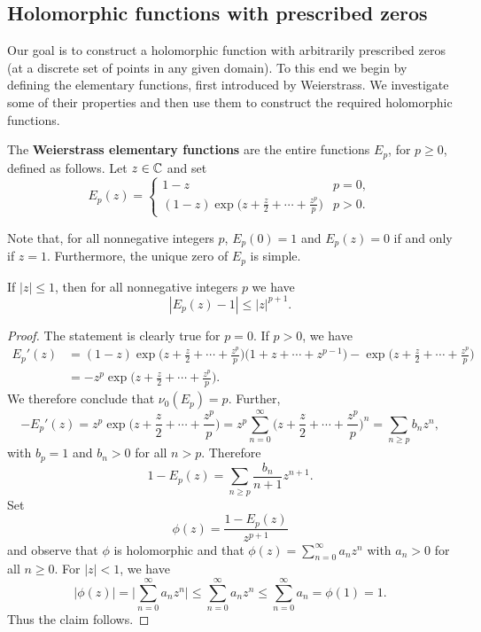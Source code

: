 \subsection{Holomorphic functions with prescribed zeros}
Our goal is to construct a holomorphic function with arbitrarily prescribed zeros (at a discrete set of points in any given domain). To this end we begin by defining the elementary functions, first introduced by Weierstrass. We investigate some of their properties and then use them to construct the required holomorphic functions.
\begin{definition}
The \textbf{Weierstrass elementary functions} are the entire functions $E_p$, for $p\geq 0$, defined as follows. Let $z\in\mathbb{C}$ and set
\[E_p(z)=\begin{cases}
1-z&p=0,\\
(1-z)\exp\Big(\displaystyle{z+\frac{z}{2}+\cdots+\frac{z^p}{p}}\Big)&p>0.
\end{cases}\]
\end{definition}
Note that, for all nonnegative integers $p$, $E_p(0)=1$ and $E_p(z)=0$ if and only if $z=1$. Furthermore, the unique zero of $E_p$ is simple.
\begin{lemma}\label{Weierstrass elementary function growth}
If $|z|\leq 1$, then for all nonnegative integers $p$ we have
\[|E_p(z)-1|\leq|z|^{p+1}.\]
\end{lemma}
\begin{proof}
The statement is clearly true for $p=0$. If $p>0$, we have
\begin{align*}
E_p'(z)&=(1-z)\exp\Big(z+\frac{z}{2}+\cdots+\frac{z^p}{p}\Big)\Big(1+z+\cdots+z^{p-1}\Big)-\exp\Big(z+\frac{z}{2}+\cdots+\frac{z^p}{p}\Big)\\
&=-z^p\exp\Big(z+\frac{z}{2}+\cdots+\frac{z^p}{p}\Big).
\end{align*}
We therefore conclude that $\nu_0(E_p)=p$. Further,
\[-E_p'(z)=z^p\exp\Big(z+\frac{z}{2}+\cdots+\frac{z^p}{p}\Big)=z^p\sum_{n=0}^{\infty}\Big(z+\frac{z}{2}+\cdots+\frac{z^p}{p}\Big)^n=\sum_{n\geq p}b_nz^n,\]
with $b_p=1$ and $b_n>0$ for all $n>p$. Therefore
\[1-E_p(z)=\sum_{n\geq p}\frac{b_n}{n+1}z^{n+1}.\]
Set
\[\phi(z)=\frac{1-E_p(z)}{z^{p+1}}\]
and observe that $\phi$ is holomorphic and that $\phi(z)=\sum_{n=0}^{\infty}a_nz^n$ with $a_n>0$ for all $n\geq 0$. For $|z|<1$, we have
\[|\phi(z)|=\Big|\sum_{n=0}^{\infty}a_nz^n\Big|\leq \sum_{n=0}^{\infty}a_nz^n\leq\sum_{n=0}^{\infty}a_n=\phi(1)=1.\]
Thus the claim follows.
\end{proof}
